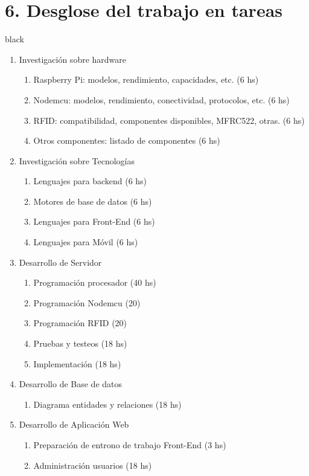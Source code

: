 \documentclass[11pt]{charter}
\begin{document}
\section{6. Desglose del trabajo en tareas}
\label{sec:wbs}
\begin{consigna}{black}
\begin{enumerate}
\item Investigación sobre hardware
	\begin{enumerate}
	\item Raspberry Pi: modelos, rendimiento, capacidades, etc. (6 hs)
	\item Nodemcu: modelos, rendimiento, conectividad, protocolos, etc.  (6 hs)
	\item RFID: compatibilidad, componentes disponibles, MFRC522, otras. (6 hs)
	\item Otros componentes: listado de componentes (6 hs)
	\end{enumerate}
\item Investigación sobre Tecnologías
	\begin{enumerate}
	\item Lenguajes para backend (6 hs)
	\item Motores de base de datos (6 hs)
	\item Lenguajes para Front-End (6 hs)
	\item Lenguajes para Móvil (6 hs)
	\end{enumerate}
\item Desarrollo de Servidor
	\begin{enumerate}
	\item Programación procesador (40 hs)
	\item Programación Nodemcu (20)
	\item Programación RFID (20)
	\item Pruebas y testeos (18 hs)
	\item Implementación (18 hs)
	\end{enumerate}
\item Desarrollo de Base de datos
	\begin{enumerate}
	\item Diagrama entidades y relaciones (18 hs)
	\end{enumerate}
\item Desarrollo de Aplicación Web
	\begin{enumerate}
	\item Preparación de entrono de trabajo Front-End (3 hs)
	\item Administración usuarios (18 hs)

\end{enumerate}
\end{enumerate}
\end{consigna}
\end{document}
